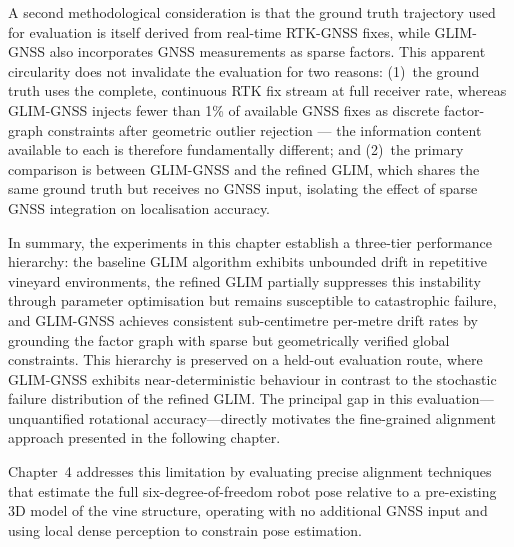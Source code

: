 A second methodological consideration is that the ground truth trajectory used for evaluation is itself derived from real-time RTK-GNSS fixes, while GLIM-GNSS also incorporates GNSS measurements as sparse factors. This apparent circularity does not invalidate the evaluation for two reasons: (1)~the ground truth uses the complete, continuous RTK fix stream at full receiver rate, whereas GLIM-GNSS injects fewer than 1\% of available GNSS fixes as discrete factor-graph constraints after geometric outlier rejection --- the information content available to each is therefore fundamentally different; and (2)~the primary comparison is between GLIM-GNSS and the refined GLIM, which shares the same ground truth but receives no GNSS input, isolating the effect of sparse GNSS integration on localisation accuracy.

In summary, the experiments in this chapter establish a three-tier performance hierarchy: the baseline GLIM algorithm exhibits unbounded drift in repetitive vineyard environments, the refined GLIM partially suppresses this instability through parameter optimisation but remains susceptible to catastrophic failure, and GLIM-GNSS achieves consistent sub-centimetre per-metre drift rates by grounding the factor graph with sparse but geometrically verified global constraints. This hierarchy is preserved on a held-out evaluation route, where GLIM-GNSS exhibits near-deterministic behaviour in contrast to the stochastic failure distribution of the refined GLIM. The principal gap in this evaluation---unquantified rotational accuracy---directly motivates the fine-grained alignment approach presented in the following chapter.

Chapter~4 addresses this limitation by evaluating precise alignment techniques that estimate the full six-degree-of-freedom robot pose relative to a pre-existing 3D model of the vine structure, operating with no additional GNSS input and using local dense perception to constrain pose estimation.